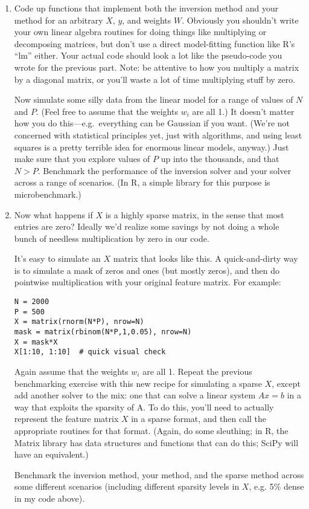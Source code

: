 \documentclass{article}
\begin{document}
\begin{enumerate}[label=(\Alph*)]
{}


\item Code up functions that implement both the inversion method and your method for an arbitrary $X$, $y$, and weights $W$.  Obviously you shouldn't write your own linear algebra routines for doing things like multiplying or decomposing matrices, but don't use a direct model-fitting function like R's ``lm'' either.   Your actual code should look a lot like the pseudo-code you wrote for the previous part.  Note: be attentive to how you multiply a matrix by a diagonal matrix, or you'll waste a lot of time multiplying stuff by zero.

Now simulate some silly data from the linear model for a range of values of $N$ and $P$.  (Feel free to assume that the weights $w_i$ are all 1.)  It doesn't matter how you do this---e.g.~everything can be Gaussian if you want.  (We're not concerned with statistical principles yet, just with algorithms, and using least squares is a pretty terrible idea for enormous linear models, anyway.)  Just make sure that you explore values of $P$ up into the thousands, and that $N > P$.  Benchmark the performance of the inversion solver and your solver across a range of scenarios.  (In R, a simple library for this purpose is microbenchmark.)

\item Now what happens if $X$ is a highly sparse matrix, in the sense that most entries are zero?  Ideally we'd realize some savings by not doing a whole bunch of needless multiplication by zero in our code.

It's easy to simulate an $X$ matrix that looks like this.  A quick-and-dirty way is to simulate a mask of zeros and ones (but mostly zeros), and then do pointwise multiplication with your original feature matrix.  For example:
\begin{verbatim}
N = 2000
P = 500
X = matrix(rnorm(N*P), nrow=N)
mask = matrix(rbinom(N*P,1,0.05), nrow=N)
X = mask*X
X[1:10, 1:10]  # quick visual check
\end{verbatim}

Again assume that the weights $w_i$ are all 1.  Repeat the previous benchmarking exercise with this new recipe for simulating a sparse $X$, except add another solver to the mix: one that can solve a linear system $Ax = b$ in a way that exploits the sparsity of A.  To do this, you'll need to actually represent the feature matrix $X$ in a sparse format, and then call the appropriate routines  for that format.  (Again, do some sleuthing; in R, the Matrix library has data structures and functions that can do this; SciPy will have an equivalent.)

Benchmark the inversion method, your method, and the sparse method across some different scenarios (including different sparsity levels in $X$, e.g. 5\% dense in my code above).
\end{enumerate}
\end{document}
